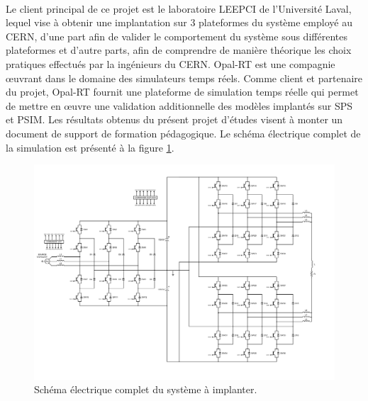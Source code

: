 \paragraph{}Le client principal de ce projet est le laboratoire LEEPCI de l'Université Laval, lequel vise à obtenir une implantation sur 3 plateformes du système employé au CERN, d'une part afin de valider le comportement du système sous différentes plateformes et d'autre parts, afin de comprendre de manière théorique les choix pratiques effectués par la ingénieurs du CERN. Opal-RT est une compagnie œuvrant dans le domaine des simulateurs temps réels. Comme client et partenaire du projet, Opal-RT fournit une plateforme de simulation temps réelle qui permet de mettre en œuvre une validation additionnelle des modèles implantés sur SPS et PSIM. Les résultats obtenus du présent projet d'études visent à monter un document de support de formation pédagogique. Le schéma électrique complet de la simulation est présenté à la figure \ref{fig_circuit_electrique_complet}.

\begin{figure}[htb]
\centering
\includegraphics[scale=0.65]{fig/AFE_3L_RC_DCP_DCN.png}
\caption{Schéma électrique complet du système à implanter.}
\label{fig_circuit_electrique_complet}
\end{figure}
